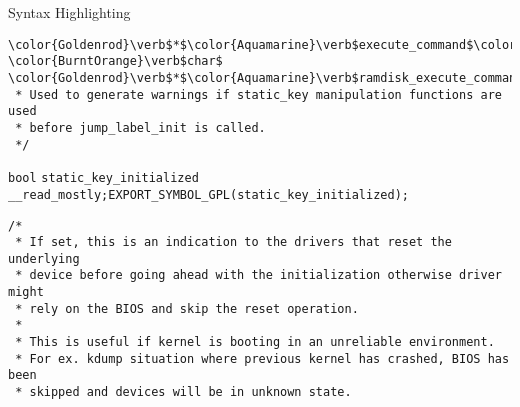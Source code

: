 \begin{frame}{Syntax Highlighting}
\begin{verbatim}
\color{Goldenrod}\verb$*$\color{Aquamarine}\verb$execute_command$\color{Fuchsia}\verb$;$\newline\color{BurntOrange}\verb$static$ \color{BurntOrange}\verb$char$ \color{Goldenrod}\verb$*$\color{Aquamarine}\verb$ramdisk_execute_command$\color{Fuchsia}\verb$;$\newline\newline\color{Rhodamine}\begin{verbatim}/*
 * Used to generate warnings if static_key manipulation functions are used
 * before jump_label_init is called.
 */\end{verbatim}\leavevmode\newline\color{Aquamarine}\verb$bool$ \color{Aquamarine}\verb$static_key_initialized$ \color{Aquamarine}\verb$__read_mostly$\color{Fuchsia}\verb$;$\newline\color{Aquamarine}\verb$EXPORT_SYMBOL_GPL$\color{Fuchsia}\verb$($\color{Aquamarine}\verb$static_key_initialized$\color{Fuchsia}\verb$)$\color{Fuchsia}\verb$;$\newline\newline\color{Rhodamine}\begin{verbatim}/*
 * If set, this is an indication to the drivers that reset the underlying
 * device before going ahead with the initialization otherwise driver might
 * rely on the BIOS and skip the reset operation.
 *
 * This is useful if kernel is booting in an unreliable environment.
 * For ex. kdump situation where previous kernel has crashed, BIOS has been
 * skipped and devices will be in unknown state.

\end{verbatim}
\end{frame}
